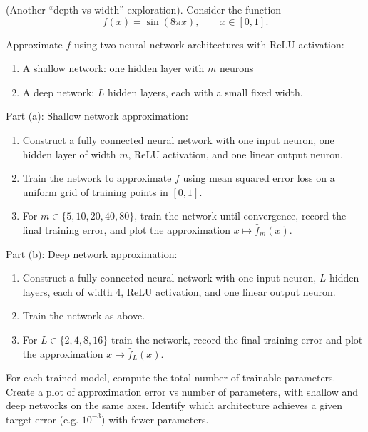 \begin{myexercise}(Another ``depth vs width'' exploration).
Consider the function
$$
f(x) = \sin(8\pi x), \qquad x \in [0,1].
$$

Approximate $f$ using two neural network architectures with ReLU activation:
\begin{enumerate}
\item[(a)] A shallow network: one hidden layer with $m$ neurons
\item[(b)] A deep network: $L$ hidden layers, each with a small fixed width.
\end{enumerate}

\smallskip
\noindent
Part (a): Shallow network approximation:

\vspace*{-2mm}
\begin{enumerate}
\item Construct a fully connected neural network with
one input neuron, one hidden layer of width $m$, 
ReLU activation, and one linear output neuron.

\item Train the network to approximate $f$ using mean squared error loss on a uniform grid of training points in $[0,1]$.

\item For $m \in \{5, 10, 20, 40, 80\}$, train the network until convergence, record the final training error, and plot the approximation $x \mapsto \hat f_m(x)$.
\end{enumerate}


\smallskip
\noindent
Part (b): Deep network approximation:

\vspace*{-2mm}
\begin{enumerate}
\item Construct a fully connected neural network with
one input neuron, $L$ hidden layers, each of width 4, ReLU activation, and one linear output neuron.

\item Train the network as above.

\item For $L \in \{2, 4, 8, 16\}$ train the network, record the final training error and plot the approximation $x \mapsto \hat f_L(x)$.
\end{enumerate}

For each trained model, compute the total number of trainable parameters.
Create a plot of approximation error vs number of parameters, with shallow and deep networks on the same axes.
Identify which architecture achieves a given target error (e.g. $10^{-3})$ with fewer parameters.




  
\end{myexercise}



